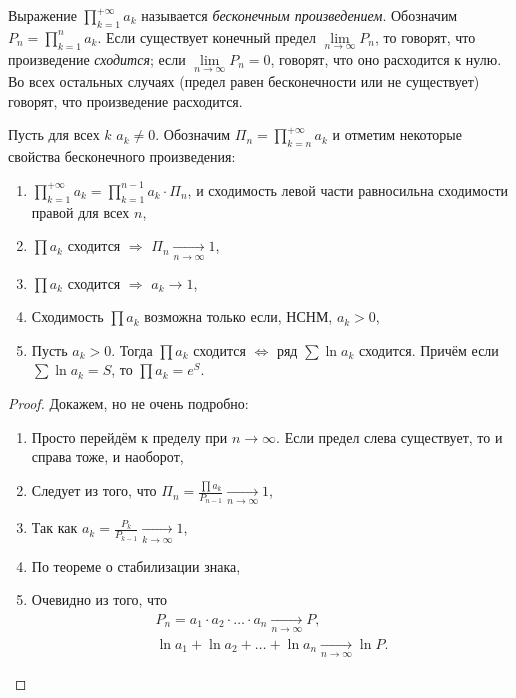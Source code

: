 \begin{definition}
	Выражение \(\prod\limits_{k=1}^{+\infty} a_k\) называется \textit{бесконечным произведением}. Обозначим \(P_n = \prod\limits_{k=1}^{n} a_k\). Если существует конечный предел \(\lim\limits_{n \to \infty} P_n\), то говорят, что произведение \textit{сходится}; если \(\lim\limits_{n \to \infty} P_n = 0\), говорят, что оно расходится к нулю. Во всех остальных случаях (предел равен бесконечности или не существует) говорят, что произведение расходится.
\end{definition}

\begin{remark} \hypertarget{besk}{}
	Пусть для всех \(k\) \(a_k \neq 0\). Обозначим \(\Pi_n = \prod\limits_{k=n}^{+\infty} a_k\) и отметим некоторые свойства бесконечного произведения:
	\begin{enumerate}
		\item \(\prod\limits_{k=1}^{+\infty} a_k = \prod\limits_{k=1}^{n-1} a_k \cdot \Pi_n\), и сходимость левой части равносильна сходимости правой для всех \(n\),
		\item \(\prod a_k\) сходится \(\Rightarrow\) \(\Pi_n \xrightarrow[n \to \infty]{} 1\),
		\item \(\prod a_k\) сходится \(\Rightarrow\) \(a_k \to 1\),
		\item Сходимость \(\prod a_k\) возможна только если, НСНМ, \(a_k > 0\),
		\item Пусть \(a_k > 0\). Тогда \(\prod a_k\) сходится \(\Leftrightarrow\) ряд \(\sum \ln a_k\) сходится. Причём если \(\sum \ln a_k = S\), то \(\prod a_k = e^S\).
	\end{enumerate}
\end{remark}
\begin{proof}
	Докажем, но не очень подробно:
	\begin{enumerate}
		\item Просто перейдём к пределу при \(n \to \infty\). Если предел слева существует, то и справа тоже, и наоборот,
		\item Следует из того, что \(\Pi_n = \frac{\prod a_k}{P_{n-1}} \xrightarrow[n \to \infty]{} 1\),
		\item Так как \(a_k = \frac{P_k}{P_{k-1}} \xrightarrow[k \to \infty]{} 1\),
		\item По теореме о стабилизации знака,
		\item Очевидно из того, что 
		\begin{gather*}
			P_n = a_1 \cdot a_2 \cdot \ldots \cdot a_n \xrightarrow[n \to \infty]{} P, \\
			\ln a_1 + \ln a_2 + \ldots + \ln a_n \xrightarrow[n \to \infty]{} \ln P.
		\end{gather*}
	\end{enumerate}
\end{proof}

